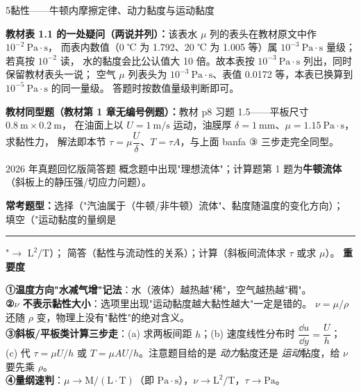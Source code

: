 \begin{kaodian}{5}{黏性——牛顿内摩擦定律、动力黏度与运动黏度}
\begin{tishi}
\textbf{教材表 1.1 的一处疑问（两说并列）：}该表水 $\mu$ 列的表头在教材原文中作 $10^{-2}\ \mathrm{Pa\cdot s}$，
而表内数值（0 ℃ 为 1.792、20 ℃ 为 1.005 等）属 $10^{-3}\ \mathrm{Pa\cdot s}$ 量级；若真按 $10^{-2}$ 读，
水的黏度会比公认值大 10 倍。故本表按 $10^{-3}\ \mathrm{Pa\cdot s}$ 列出，同时保留教材表头一说；
空气 $\mu$ 列表头为 $10^{-3}\ \mathrm{Pa\cdot s}$、表值 0.0172 等，本表已换算到 $10^{-5}\ \mathrm{Pa\cdot s}$ 的同一量级。
答题时按数值量级判断即可。
\end{tishi}

\textbf{教材同型题（教材第 1 章无编号例题）：}教材 p8 习题 1.5——平板尺寸 $0.8\ \mathrm{m}\times0.2\ \mathrm{m}$，
在油面上以 $U=1\ \mathrm{m/s}$ 运动，油膜厚 $\delta=1\ \mathrm{mm}$、$\mu=1.15\ \mathrm{Pa\cdot s}$，求黏性力，
解法即本节 $\tau=\mu\dfrac{U}{\delta}$、$T=\tau A$，与上面 banfa ③ 三步走完全同型。

\begin{zhenti}{2026 年真题回忆版}{简答题}
概念题中出现"理想流体"；计算题第 1 题为\textbf{牛顿流体}（斜板上的静压强/切应力问题）。
\end{zhenti}

\textbf{常考题型：}选择（"汽油属于（牛顿/非牛顿）流体"、黏度随温度的变化方向）；
填空（"运动黏度的量纲是\rule{2cm}{0.4pt}"$\to$ $\mathrm{L^2/T}$）；
简答（黏性与流动性的关系）；计算（斜板间流体求 $\tau$ 或求 $\mu$）。
\textbf{重要度 }\quad{}\quad{}

\begin{banfa}
\textbf{①温度方向"水减气增"记法}：水（液体）越热越"稀"，空气越热越"稠"。\\
\textbf{②$\nu$ 不表示黏性大小}：选项里出现"运动黏度越大黏性越大"一定是错的。
$\nu=\mu/\rho$ 还随 $\rho$ 变，物理上没有"黏性"的绝对含义。\\
\textbf{③斜板/平板类计算三步走}：(a) 求两板间距 $h$；(b) 速度线性分布时 $\dfrac{\dd u}{\dd y}=\dfrac{U}{h}$；
(c) 代 $\tau=\mu U/h$ 或 $T=\mu A U/h$。注意题目给的是 \emph{动力}黏度还是 \emph{运动}黏度，给 $\nu$ 要先乘 $\rho$。\\
\textbf{④量纲速判}：$\mu\to\mathrm{M/(L\cdot T)}$（即 $\mathrm{Pa\cdot s}$），$\nu\to\mathrm{L^2/T}$，$\tau\to\mathrm{Pa}$。
\end{banfa}
\end{kaodian}

